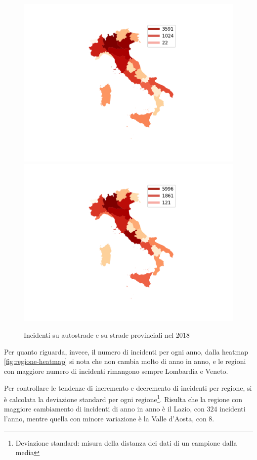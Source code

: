 \documentclass[a4paper]{report}
\begin{document}
\begin{figure}
    \includegraphics[width=0.5\linewidth]{../src/incidenti/incidenti_aci/mappe_regioni/incidenti_regione.png}
    \includegraphics[width=0.5\linewidth]{../src/incidenti/incidenti_aci/mappe_regioni/incidenti_regione_autostrade.png}
    \caption{Incidenti su autostrade e su strade provinciali nel 2018}
    \label{fig:incidenti-per-regione}
\end{figure}

Per quanto riguarda, invece, il numero di incidenti per ogni anno, 
dalla heatmap \ref{fig:regione-heatmap} 
si nota che non cambia molto di anno in anno, e le regioni con maggiore numero di incidenti 
rimangono sempre Lombardia e Veneto.

Per controllare le tendenze di incremento e decremento di incidenti per regione, 
si è calcolata la deviazione standard per ogni regione\footnote{Deviazione standard: 
misura della distanza dei dati di un campione dalla media\cite{PROB_E_STATISTICA:2}}.
Risulta che la regione con maggiore cambiamento di incidenti di anno in anno è il Lazio, 
con $324$ incidenti l'anno, mentre quella con minore variazione è la Valle d'Aosta, con $8$.
\end{document}
